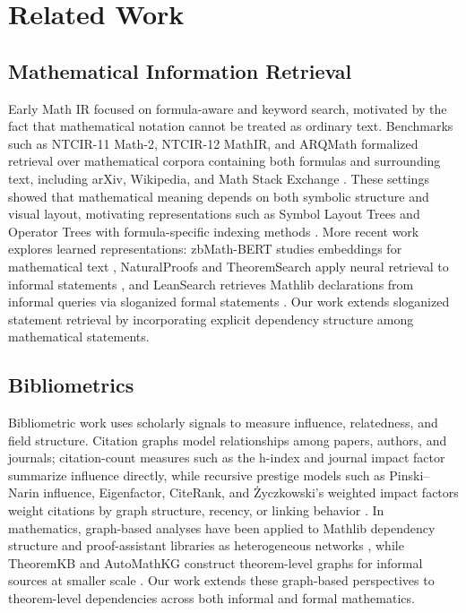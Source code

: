\section{Related Work}

\subsection{Mathematical Information Retrieval}

Early Math IR focused on formula-aware and keyword search, motivated by the fact that mathematical notation cannot be treated as ordinary text. Benchmarks such as NTCIR-11 Math-2, NTCIR-12 MathIR, and ARQMath formalized retrieval over mathematical corpora containing both formulas and surrounding text, including arXiv, Wikipedia, and Math Stack Exchange \cite{ntcir-11-math-2, ntcir-12-math-ir, mansouri-arqmath-3}. These settings showed that mathematical meaning depends on both symbolic structure and visual layout, motivating representations such as Symbol Layout Trees and Operator Trees with formula-specific indexing methods \cite{zanibbi2015tangentsearchengineimproved}. More recent work explores learned representations: zbMath-BERT studies embeddings for mathematical text \cite{zbmath-bert}, NaturalProofs and TheoremSearch apply neural retrieval to informal statements \cite{naturalproofs, theoremsearch2026}, and LeanSearch retrieves Mathlib declarations from informal queries via sloganized formal statements \cite{leansearch-v1, leansearch-v2}. Our work extends sloganized statement retrieval by incorporating explicit dependency structure among mathematical statements.

\subsection{Bibliometrics}

Bibliometric work uses scholarly signals to measure influence, relatedness, and field structure. Citation graphs model relationships among papers, authors, and journals; citation-count measures such as the h-index and journal impact factor summarize influence directly, while recursive prestige models such as Pinski--Narin influence, Eigenfactor, CiteRank, and \.{Z}yczkowski's weighted impact factors weight citations by graph structure, recency, or linking behavior \cite{journal-impact-factor, h-index-paper, pinski-narin, bergstrom-eigenfactor, walker-citerank, zyczkowski-citation-graph}. In mathematics, graph-based analyses have been applied to Mathlib dependency structure and proof-assistant libraries as heterogeneous networks \cite{li-network-structure-mathlib, bauer-datasets-for-formal}, while TheoremKB and AutoMathKG construct theorem-level graphs for informal sources at smaller scale \cite{mishra-theoremkb, automathkg}. Our work extends these graph-based perspectives to theorem-level dependencies across both informal and formal mathematics.

